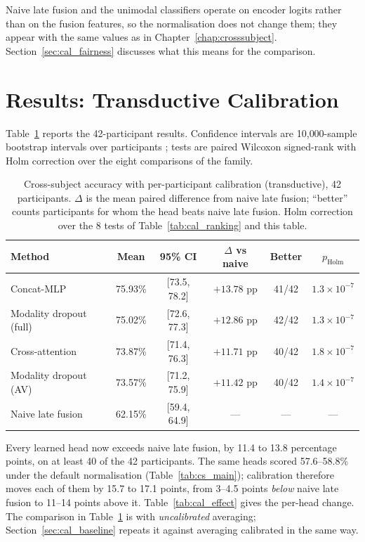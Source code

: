 Naive late fusion and the unimodal classifiers operate on encoder logits rather than
on the fusion features, so the normalisation does not change them; they appear with
the same values as in Chapter~\ref{chap:crosssubject}. Section~\ref{sec:cal_fairness}
discusses what this means for the comparison.

\section{Results: Transductive Calibration}
\label{sec:cal_transductive}

Table~\ref{tab:cal_main} reports the 42-participant results. Confidence intervals are
10{,}000-sample bootstrap intervals over participants \cite{Efron1993Bootstrap}; tests
are paired Wilcoxon signed-rank \cite{Wilcoxon1945} with Holm correction
\cite{Holm1979} over the eight comparisons of the family.

\begin{table}[htbp]
\centering
\small
\caption{Cross-subject accuracy with per-participant calibration (transductive), 42
participants. $\Delta$ is the mean paired difference from naive late fusion;
``better'' counts participants for whom the head beats naive late fusion. Holm
correction over the 8 tests of Table~\ref{tab:cal_ranking} and this table.}
\label{tab:cal_main}
\begin{tabular}{lccccc}
\hline
\textbf{Method} & \textbf{Mean} & \textbf{95\% CI} & \textbf{$\Delta$ vs naive} & \textbf{Better} & \textbf{$p_{\mathrm{Holm}}$} \\
\hline
Concat-MLP              & 75.93\% & [73.5, 78.2] & $+13.78$ pp & 41/42 & $1.3\times10^{-7}$ \\
Modality dropout (full) & 75.02\% & [72.6, 77.3] & $+12.86$ pp & 42/42 & $1.3\times10^{-7}$ \\
Cross-attention         & 73.87\% & [71.4, 76.3] & $+11.71$ pp & 40/42 & $1.8\times10^{-7}$ \\
Modality dropout (AV)   & 73.57\% & [71.2, 75.9] & $+11.42$ pp & 40/42 & $1.4\times10^{-7}$ \\
Naive late fusion       & 62.15\% & [59.4, 64.9] & ---          & ---   & --- \\
\hline
\end{tabular}
\end{table}

Every learned head now exceeds naive late fusion, by 11.4 to 13.8 percentage points,
on at least 40 of the 42 participants. The same heads scored 57.6--58.8\% under the
default normalisation (Table~\ref{tab:cs_main}); calibration therefore moves each of
them by 15.7 to 17.1 points, from 3--4.5 points \emph{below} naive late fusion to
11--14 points above it. Table~\ref{tab:cal_effect} gives the per-head change. The
comparison in Table~\ref{tab:cal_main} is with \emph{uncalibrated} averaging;
Section~\ref{sec:cal_baseline} repeats it against averaging calibrated in the same way.

